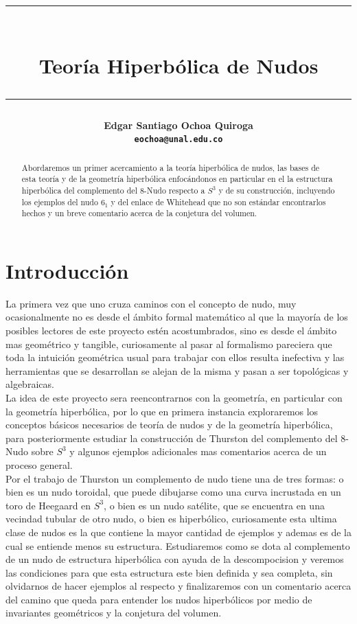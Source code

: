 \documentclass[12pt]{article}
\title{\vspace{-2cm}\par\noindent\rule{16cm}{1pt}\large
\\\bfseries Teoría Hiperbólica de Nudos
\vspace{-0.34cm}\par\noindent\hspace{0.15cm}\rule{16cm}{1pt}
\vspace{-0.6cm}
}
\author{\small \bfseries \quad \small Edgar Santiago Ochoa Quiroga\\ \small \quad \quad \texttt{eochoa@unal.edu.co}\quad\quad \quad\\}
\begin{document}
\maketitle
\begin{abstract}
    Abordaremos un primer acercamiento a la teoría hiperbólica de nudos, las bases de esta teoría y de la geometría hiperbólica enfocándonos en particular en el la estructura hiperbólica del complemento del 8-Nudo respecto a $S^3$ y de su construcción, incluyendo los ejemplos del nudo $6_1$ y del enlace de Whitehead que no son estándar encontrarlos hechos y un breve comentario acerca de la conjetura del volumen.
\end{abstract}
\section{Introducción}
    La primera vez que uno cruza caminos con el concepto de nudo, muy ocasionalmente no es desde el ámbito formal matemático al que la mayoría de los posibles lectores de este proyecto estén acostumbrados, sino es desde el ámbito mas geométrico y tangible, curiosamente al pasar al formalismo pareciera que toda la intuición geométrica usual para trabajar con ellos resulta inefectiva y las herramientas que se desarrollan se alejan de la misma y pasan a ser topológicas y algebraicas.\\

    La idea de este proyecto sera reencontrarnos con la geometría, en particular con la geometría hiperbólica, por lo que en primera instancia exploraremos los conceptos básicos necesarios de teoría de nudos y de la geometría hiperbólica, para posteriormente estudiar la construcción de Thurston del complemento del 8-Nudo sobre $S^3$ y algunos ejemplos adicionales mas comentarios acerca de un proceso general.\\

    Por el trabajo de Thurston un complemento de nudo tiene una de tres formas: o bien es un nudo toroidal, que puede dibujarse como una curva incrustada en un toro de Heegaard en $S^3$, o bien es un nudo satélite, que se encuentra en una vecindad tubular de otro nudo, o bien es hiperbólico, curiosamente esta ultima clase de nudos es la que contiene la mayor cantidad de ejemplos y ademas es de la cual se entiende menos su estructura. Estudiaremos como se dota al complemento de un nudo de estructura hiperbólica con ayuda de la descompocision y veremos las condiciones para que esta estructura este bien definida y sea completa, sin olvidarnos de hacer ejemplos al respecto y finalizaremos con un comentario acerca del camino que queda para entender los nudos hiperbólicos por medio de invariantes geométricos y la conjetura del volumen.
\end{document}
